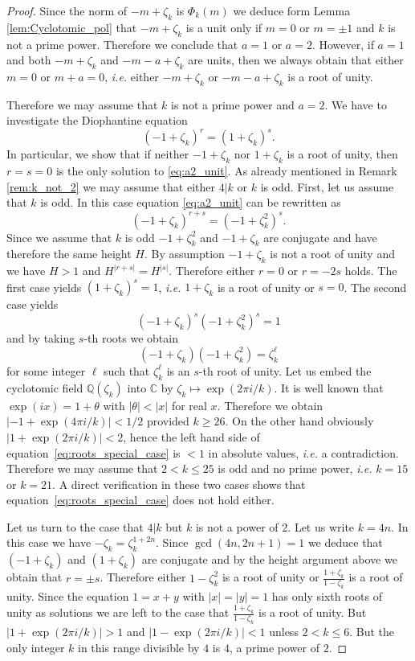 \documentclass{amsart}
\theoremstyle{plain}
\numberwithin{equation}{section}
\theoremstyle{remark}
\begin{document}
\begin{proof}
  Since the norm of $-m+\zeta_k$ is $\Phi_k(m)$ we deduce form Lemma
  \ref{lem:Cyclotomic_pol} that $-m+\zeta_k$ is a unit only if $m=0$
  or $m=\pm 1$ and $k$ is not a prime power. Therefore we conclude
  that $a=1$ or $a=2$. However, if $a=1$ and both $-m+\zeta_k$ and
  $-m-a+\zeta_k$ are units, then we always obtain that either $m=0$ or
  $m+a=0$, \textit{i.e.} either $-m+\zeta_k$ or $-m-a+\zeta_k$ is a
  root of unity.

Therefore we may assume that $k$ is not a prime power and $a=2$. We have to investigate the Diophantine equation
\begin{equation}\label{eq:a2_unit}
(-1+\zeta_k)^r= (1+\zeta_k)^s.
\end{equation}
In particular, we show that if neither $-1+\zeta_k$ nor $1+\zeta_k$ is a root of unity, then $r=s=0$ is the only solution to \eqref{eq:a2_unit}.
As already mentioned in Remark \ref{rem:k_not_2} we may assume that either $4|k$ or $k$ 
is odd. First, let us assume that $k$ is odd. In this case equation \eqref{eq:a2_unit} can be rewritten as
$$ (-1+\zeta_k)^{r+s}=(-1+\zeta_k^2)^{s}.$$
Since we assume that $k$ is odd $-1+\zeta_k^2$ and $-1+\zeta_k$ are conjugate and have therefore the same height $H$. By assumption $-1+\zeta_k$ is not a root 
of unity and we have $H>1$ and $H^{|r+s|}=H^{|s|}$. Therefore either $r=0$ or $r=-2s$ holds. The first case yields $(1+\zeta_k)^s=1$, \textit{i.e.} $1+\zeta_k$ is a 
root of unity or $s=0$. The second case yields
$$ (-1+\zeta_k)^s(-1+\zeta_k^2)^s=1$$
and by taking $s$-th roots we obtain 
\begin{equation}\label{eq:roots_special_case}
(-1+\zeta_k)(-1+\zeta_k^2)=\zeta_k^\ell
\end{equation}
for some integer $\ell$ such that $\zeta_k^\ell$ is an $s$-th root of unity. Let us embed the cyclotomic field ${{\mathbb Q}}(\zeta_k)$ into ${{\mathbb C}}$ 
by $\zeta_k\mapsto \exp(2\pi i/k)$. It is well known that $\exp(ix)=1+\theta$ with $|\theta|<|x|$ for real $x$.
Therefore we obtain $|-1+\exp(4\pi i/k)|<1/2$ provided $k\geq 26$. On the other hand obviously $|1+\exp(2\pi i/k)|<2$, hence the left hand side of 
equation~\eqref{eq:roots_special_case} is $<1$ in absolute values, \textit{i.e.} a contradiction. Therefore we may assume that $2<k\leq 25$ is odd and no prime power, 
\textit{i.e.} $k=15$ or $k=21$. A direct verification in these two cases shows that equation~\eqref{eq:roots_special_case} does not hold either.

Let us turn to the case that $4|k$ but $k$ is not a power of $2$. Let us write $k=4n$. In this case we have $-\zeta_k=\zeta_k^{1+2n}$. Since 
$\gcd(4n,2n+1)=1$ we deduce that $(-1+\zeta_k)$ and $(1+\zeta_k)$ are conjugate and by the height argument above we obtain that $r=\pm s$. Therefore either
$1-\zeta_k^2$ is a root of unity or $\frac{1+\zeta_k}{1-\zeta_k}$ is a root of unity. Since the equation $1=x+y$ with $|x|=|y|=1$ has only sixth roots of unity 
as solutions we are left to the case that $\frac{1+\zeta_k}{1-\zeta_k}$ is a root of unity. But $|1+\exp(2\pi i/k)|>1$ and $|1-\exp(2\pi i/k)|<1$ unless 
$2< k\leq 6$. But the only integer $k$ in this range divisible by $4$ is $4$, a prime power of $2$.
\end{proof}
\end{document}
